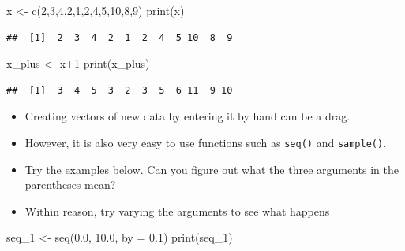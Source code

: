 \documentclass[
]{book}
\newenvironment{Shaded}{\begin{snugshade}}{\end{snugshade}}
\newcommand{\AttributeTok}[1]{\textcolor[rgb]{0.77,0.63,0.00}{#1}}
\newcommand{\DecValTok}[1]{\textcolor[rgb]{0.00,0.00,0.81}{#1}}
\newcommand{\FloatTok}[1]{\textcolor[rgb]{0.00,0.00,0.81}{#1}}
\newcommand{\FunctionTok}[1]{\textcolor[rgb]{0.00,0.00,0.00}{#1}}
\newcommand{\NormalTok}[1]{#1}
\newcommand{\OtherTok}[1]{\textcolor[rgb]{0.56,0.35,0.01}{#1}}
\newcommand{\SpecialCharTok}[1]{\textcolor[rgb]{0.00,0.00,0.00}{#1}}
\begin{document}
\begin{Shaded}
\begin{Highlighting}[]
\NormalTok{x }\OtherTok{\textless{}{-}} \FunctionTok{c}\NormalTok{(}\DecValTok{2}\NormalTok{,}\DecValTok{3}\NormalTok{,}\DecValTok{4}\NormalTok{,}\DecValTok{2}\NormalTok{,}\DecValTok{1}\NormalTok{,}\DecValTok{2}\NormalTok{,}\DecValTok{4}\NormalTok{,}\DecValTok{5}\NormalTok{,}\DecValTok{10}\NormalTok{,}\DecValTok{8}\NormalTok{,}\DecValTok{9}\NormalTok{)}
\FunctionTok{print}\NormalTok{(x)}
\end{Highlighting}
\end{Shaded}

\begin{verbatim}
##  [1]  2  3  4  2  1  2  4  5 10  8  9
\end{verbatim}

\begin{Shaded}
\begin{Highlighting}[]
\NormalTok{x\_plus }\OtherTok{\textless{}{-}}\NormalTok{ x}\SpecialCharTok{+}\DecValTok{1}
\FunctionTok{print}\NormalTok{(x\_plus)}
\end{Highlighting}
\end{Shaded}

\begin{verbatim}
##  [1]  3  4  5  3  2  3  5  6 11  9 10
\end{verbatim}

\begin{itemize}
\item
  Creating vectors of new data by entering it by hand can be a drag.
\item
  However, it is also very easy to use functions such as \texttt{seq()} and \texttt{sample()}.
\item
  Try the examples below. Can you figure out what the three arguments in the parentheses mean?
\item
  Within reason, try varying the arguments to see what happens
\end{itemize}

\begin{Shaded}
\begin{Highlighting}[]
\NormalTok{seq\_1 }\OtherTok{\textless{}{-}} \FunctionTok{seq}\NormalTok{(}\FloatTok{0.0}\NormalTok{, }\FloatTok{10.0}\NormalTok{, }\AttributeTok{by =} \FloatTok{0.1}\NormalTok{)}
\FunctionTok{print}\NormalTok{(seq\_1)}
\end{Highlighting}
\end{Shaded}
\end{document}
